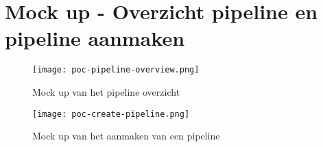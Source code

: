 \section{Mock up - Overzicht pipeline en pipeline aanmaken}\label{appendix:mockup-overview-and-create-pipeline}
\begin{figure}[hbt!]
  \centering
  \texttt{[image: poc-pipeline-overview.png]}
  \caption{Mock up van het pipeline overzicht}
  \label{fig:mockup-overview-pipeline}
\end{figure}

\begin{figure}[hbt!]
  \centering
  \texttt{[image: poc-create-pipeline.png]}
  \caption{Mock up van het aanmaken van een pipeline}
  \label{fig:mockup-create-pipeline}
\end{figure}

\newpage